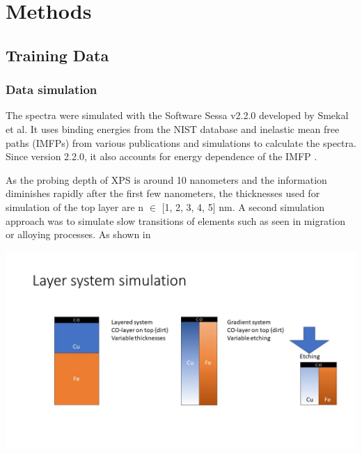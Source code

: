 


\chapter{Methods} %

\label{Chapter3} %


\section{Training Data}



\subsection{Data simulation}

The spectra were simulated with the Software Sessa v2.2.0 developed by Smekal et al. It uses binding energies from the NIST database and inelastic mean free paths (IMFPs) from various publications and simulations to calculate the spectra. Since version 2.2.0, it also accounts for energy dependence of the IMFP \cite{noauthor_nist_2010}.

As the probing depth of XPS is around 10 nanometers and the information diminishes rapidly after the first few nanometers, the thicknesses used for simulation of the top layer are n $\in$ [1, 2, 3, 4, 5] nm. A second simulation approach was to simulate slow transitions of elements such as seen in migration or alloying processes. As shown in 

\includegraphics[scale=0.4]{Figures/Layers.jpg}

